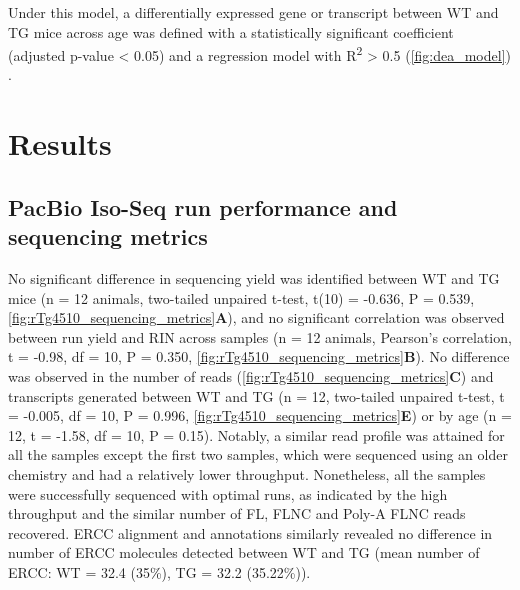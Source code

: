 Under this model, a differentially expressed gene or transcript between WT and TG mice across age was defined with a statistically significant coefficient (adjusted p-value < 0.05) and a regression model with R\textsuperscript{2} > 0.5  (\cref{fig:dea_model}) .


\clearpage 
\section{Results}
\subsection{PacBio Iso-Seq run performance and sequencing metrics}
No significant difference in sequencing yield was identified between WT and TG mice (n = 12 animals, two-tailed unpaired t-test, t(10) = -0.636, P = 0.539, \cref{fig:rTg4510_sequencing_metrics}\textbf{A}), and no significant correlation was observed between run yield and RIN across samples (n = 12 animals, Pearson's correlation, t = -0.98, df = 10, P = 0.350, \cref{fig:rTg4510_sequencing_metrics}\textbf{B}). No difference was observed in the number of reads (\cref{fig:rTg4510_sequencing_metrics}\textbf{C}) and transcripts generated between WT and TG (n = 12, two-tailed unpaired t-test, t = -0.005, df = 10, P = 0.996, \cref{fig:rTg4510_sequencing_metrics}\textbf{E}) or by age (n = 12, t = -1.58, df = 10, P = 0.15). Notably, a similar read profile was attained for all the samples except the first two samples, which were sequenced using an older chemistry and had a relatively lower throughput. Nonetheless, all the samples were successfully sequenced with optimal runs, as indicated by the high throughput and the similar number of FL, FLNC and Poly-A FLNC reads recovered. ERCC alignment and annotations similarly revealed no difference in number of ERCC molecules detected between WT and TG (mean number of ERCC: WT = 32.4 (35\%), TG = 32.2 (35.22\%)). 

